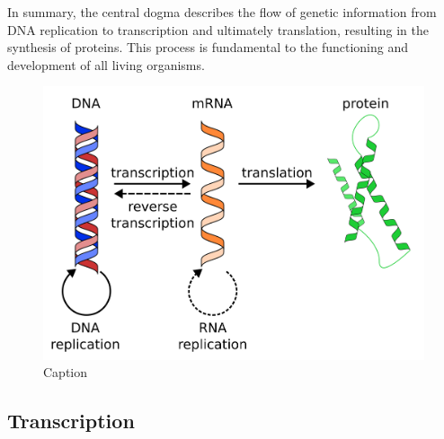 In summary, the central dogma describes the flow of genetic information from DNA replication to transcription and ultimately translation, resulting in the synthesis of proteins. This process is fundamental to the functioning and development of all living organisms.

\begin{figure}[H]
    \includegraphics[width=\linewidth]{ch1.Introduction/imgs/central_dogma.png}
    \caption{Caption}
    \label{fig:central_dogma}
\end{figure}

\subsection{Transcription}

